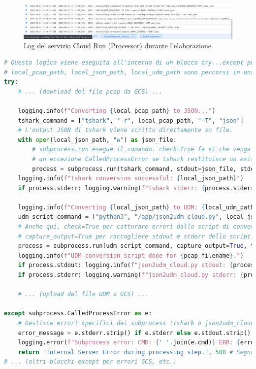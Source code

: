 \documentclass[11pt, a4paper]{article}
\begin{document}
\begin{figure}[!htbp]
    \centering
    \includegraphics[width=\textwidth]{pics/LOG_PROCESSOR_131523.png}
    \caption{Log del servizio Cloud Run (Processor) durante l'elaborazione.}
    \label{fig:cloudrun_logs}
\end{figure}

\begin{lstlisting}[language=Python, caption={Estratto da \texttt{processor\_app.py}: Chiamata ai subprocess per \texttt{tshark} e \texttt{json2udm\_cloud.py}.}, label=lst:processor_subprocesses, basicstyle=\ttfamily\scriptsize]
# Questa logica viene eseguita all'interno di un blocco try...except per la gestione degli errori.
# local_pcap_path, local_json_path, local_udm_path sono percorsi in una directory temporanea.
try:
    # ... (download del file pcap da GCS) ...

    logging.info(f"Converting {local_pcap_path} to JSON...")
    tshark_command = ["tshark", "-r", local_pcap_path, "-T", "json"]
    # L'output JSON di tshark viene scritto direttamente su file.
    with open(local_json_path, "w") as json_file:
        # subprocess.run esegue il comando. check=True fa si che venga sollevata
        # un'eccezione CalledProcessError se tshark restituisce un exit code non zero.
        process = subprocess.run(tshark_command, stdout=json_file, stderr=subprocess.PIPE, text=True, check=True)
    logging.info(f"tshark conversion successful: {local_json_path}")
    if process.stderr: logging.warning(f"tshark stderr: {process.stderr.strip()}")

    logging.info(f"Converting {local_json_path} to UDM: {local_udm_path}")
    udm_script_command = ["python3", "/app/json2udm_cloud.py", local_json_path, local_udm_path]
    # Anche qui, check=True per catturare errori dallo script di conversione UDM.
    # capture_output=True per raccogliere stdout e stderr dello script.
    process = subprocess.run(udm_script_command, capture_output=True, text=True, check=True)
    logging.info(f"UDM conversion script done for {pcap_filename}.")
    if process.stdout: logging.info(f"json2udm_cloud.py stdout: {process.stdout.strip()}")
    if process.stderr: logging.warning(f"json2udm_cloud.py stderr: {process.stderr.strip()}")

    # ... (upload del file UDM a GCS) ...

except subprocess.CalledProcessError as e:
    # Gestisce errori specifici dei subprocess (tshark o json2udm_cloud.py).
    error_message = e.stderr.strip() if e.stderr else e.stdout.strip()
    logging.error(f"Subprocess error: CMD: {' '.join(e.cmd)} ERR: {error_message}", exc_info=False)
    return "Internal Server Error during processing step.", 500 # Segnala a Pub/Sub di ritentare.
# ... (altri blocchi except per errori GCS, etc.)
\end{lstlisting} 
\end{document}
